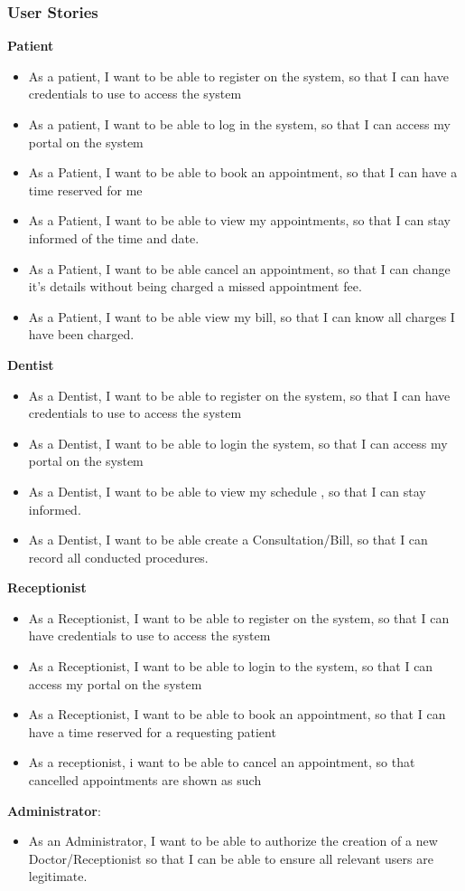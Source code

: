 \documentclass[11 pt]{article}
\begin{document}
\subsubsection{User Stories}
\textbf{Patient}
\begin{itemize}
\item
As a patient, I want to be able to register on the system, so that I can have credentials to use to access the system
\item
As a patient, I want to be able to log in the system, so that I can access my portal on the system
\item
As a Patient, I want to be able to book an appointment, so that I can 				have a time reserved for me
\item
As a Patient, I want to be able to view my appointments, so that I can stay informed of the time and date.
\item
As a Patient, I want to be able cancel an appointment, so that I can change it's details without being charged a missed appointment fee.
\item
As a Patient, I want to be able view my bill, so that I can know all charges I have been charged.
\end{itemize}
\textbf{Dentist}
\begin{itemize}
\item
As a Dentist, I want to be able to register on the system, so that I can have credentials to use to access the system
\item
As a Dentist, I want to be able to login the system, so that I can access my portal on the system
\item
As a Dentist, I want to be able to view my schedule , so that I can stay informed.
\item
As a Dentist, I want to be able create a Consultation/Bill, so that I can record all conducted procedures.
\end{itemize}
\textbf{Receptionist}
\begin{itemize}
\item
As a Receptionist, I want to be able to register on the system, so that I can have credentials to use to access the system
\item
As a Receptionist, I want to be able to login to the system, so that I can access my portal on the system
\item
As a Receptionist, I want to be able to book an appointment, so that I can 				have a time reserved for a requesting patient
\item
As a receptionist, i want to be able to cancel an appointment, so that cancelled appointments are shown as such
\end{itemize}
\textbf{Administrator}:
\begin{itemize}
\item
As an Administrator, I want to be able to authorize the creation of a new Doctor/Receptionist so that I can be able to ensure all relevant users are legitimate.
\end{itemize}
\end{document}
